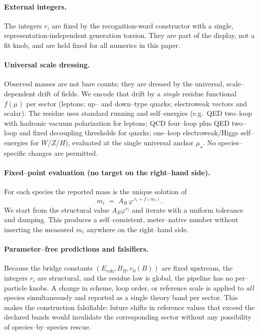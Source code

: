\documentclass[epjc3]{svjour3}
\begin{document}
\paragraph{External integers.}
The integers $r_i$ are fixed by the recognition-word constructor with a single, representation-independent generation torsion. They are part of the display, not a fit knob, and are held fixed for all numerics in this paper.

\paragraph{Universal scale dressing.}
Observed masses are not bare counts; they are dressed by the universal, scale–dependent drift of fields. We encode that drift by a \emph{single} residue functional $f(\mu)$ per sector (leptons; up– and down–type quarks; electroweak vectors and scalar). The residue uses standard running and self–energies (e.g.\ QED two–loop with hadronic vacuum polarization for leptons; QCD four–loop plus QED two–loop and fixed decoupling thresholds for quarks; one–loop electroweak/Higgs self–energies for $W/Z/H$), evaluated at the single universal anchor $\mu_\star$. No species–specific changes are permitted.

\paragraph{Fixed–point evaluation (no target on the right–hand side).}
For each species the reported mass is the unique solution of
\[
m_i \;=\; A_B\,\varphi^{\,r_i+f(m_i)}.
\]
We start from the structural value $A_B\varphi^{r_i}$ and iterate with a uniform tolerance and damping. This produces a self–consistent, meter–native number without inserting the measured $m_i$ anywhere on the right–hand side.

\paragraph{Parameter–free predictions and falsifiers.}
Because the bridge constants $(E_{\mathrm{coh}},B_B,r_0(B))$ are fixed upstream, the integers $r_i$ are structural, and the residue law is global, the pipeline has no per–particle knobs. A change in scheme, loop order, or reference scale is applied to \emph{all} species simultaneously and reported as a single theory band per sector. This makes the construction falsifiable: future shifts in reference values that exceed the declared bands would invalidate the corresponding sector without any possibility of species–by–species rescue.
\end{document}
